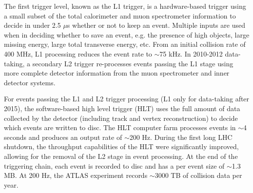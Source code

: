 The first trigger level, known as the L1 trigger, is a hardware-based trigger using a small subset of the total calorimeter and muon spectrometer information to decide in under 2.5 $\mu$s whether or not to keep an event. Multiple inputs are used when in deciding whether to save an event, e.g. the presence of high \pt objects, large missing energy, large total transverse energy, etc. From an initial collision rate of 400 MHz, L1 processing reduces the event rate to $\sim$75 kHz. In 2010-2012 data-taking, a secondary L2 trigger re-processes events passing the L1 stage using more complete detector information from the muon spectrometer and inner detector systems. 

For events passing the L1 and L2 trigger processing (L1 only for data-taking after 2015), the software-based high level trigger (HLT) uses the full amount of data collected by the detector (including track and vertex reconstruction) to decide which events are written to disc. The HLT computer farm processes events in $\sim$4 seconds and produces an output rate of $\sim$200 Hz. During the first long LHC shutdown, the throughput capabilities of the HLT were significantly improved, allowing for the removal of the L2 stage in event processing. At the end of the triggering chain, each event is recorded to disc and has a per event size of $\sim$1.3 MB. At 200 Hz, the ATLAS experiment records $\sim$3000 TB of collision data per year.
